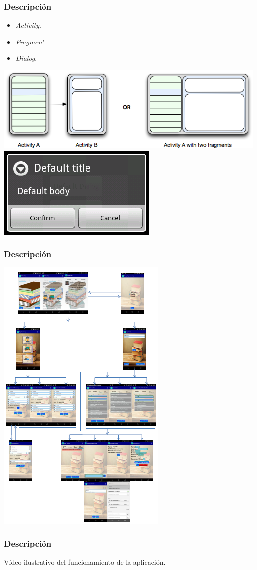\begin{frame}
	\frametitle{Descripción}
		\begin{itemize}
			\item {\it Activity}.
			\item {\it Fragment}.
			\item {\it Dialog}.
		\end{itemize}
	\endblock{}
	
	{\inserttitlegraphic\par}
	\vfill \includegraphics[width=0.7\linewidth]{Images/android_fragments}
	\hfill \includegraphics[width=0.25\linewidth]{Images/dialog}
	
\end{frame}


\begin{frame}
	\frametitle{Descripción}
	\includegraphics[width=0.3\linewidth]{Images/mapaActividades.png}
\end{frame}


\begin{frame}
	\frametitle{Descripción}
	\block{}
		Vídeo ilustrativo del funcionamiento de la aplicación.
	\endblock{}
\end{frame}